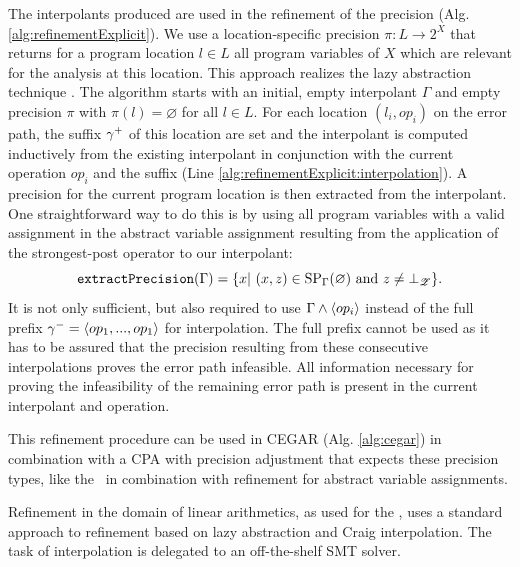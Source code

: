 The interpolants produced are used in the refinement of the precision (Alg. \ref{alg:refinementExplicit}).
We use a location-specific precision $\pi : L \rightarrow 2^X$ that returns for a program location $l \in L$ all program variables of $X$ which are relevant for the analysis at this location. This approach realizes the lazy abstraction technique \cite{Henzinger2002}.
The algorithm starts with an initial, empty interpolant $\Gamma$ and empty precision $\pi$ with $\pi(l) = \varnothing$ for all $l \in L$.
For each location $(l_i, op_i)$ on the error path, the suffix ${\gamma^{+}}$ of this location are set and the interpolant is computed inductively from the existing interpolant in conjunction with the current operation $op_i$ and the suffix (Line \ref{alg:refinementExplicit:interpolation}).
A precision for the current program location is then extracted from the interpolant.
One straightforward way to do this is by using all program variables with a valid assignment in the  abstract variable assignment resulting from the application of the strongest-post operator to our interpolant:
\[\texttt{extractPrecision}(\Gamma) = \{ x |\ (x, z) \in \text{SP}_\Gamma (\varnothing ) \text{ and } z \neq \bot_{\mathscr{Z}} \}.\]
It is not only sufficient, but also required to use $\Gamma \wedge \langle op_i \rangle$ instead of the full prefix ${\gamma^{-}} = \langle op_1, ..., op_1 \rangle$ for interpolation. The full prefix cannot be used as it has to be assured that the precision resulting from these consecutive interpolations proves the error path infeasible. All information necessary for proving the infeasibility of the remaining error path is present in the current interpolant and operation.

This refinement procedure can be used in CEGAR (Alg. \ref{alg:cegar}) in combination with a CPA with precision adjustment that expects these precision types, like the \ in combination with refinement for abstract variable assignments.

Refinement in the domain of linear arithmetics, as used for the \predicateCPA, uses a standard approach to refinement based on lazy abstraction and Craig interpolation.
The task of interpolation is delegated to an off-the-shelf SMT solver.

